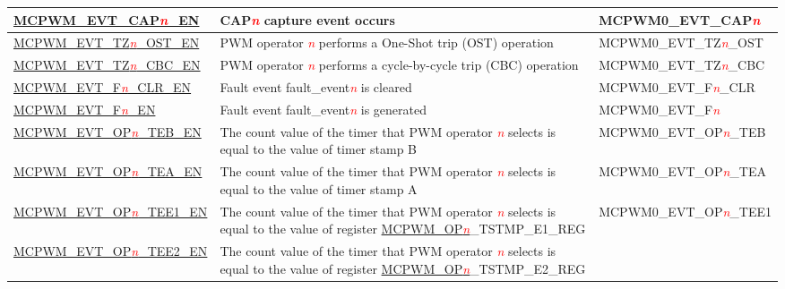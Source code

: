 \begin{ThreePartTable}
\begin{longtable}[c]{| l | L{7cm} | l |}
    \hyperref[fielddesc:MCPWMEVTCAP0EN]{MCPWM\_EVT\_CAP\textcolor{red}{\it{n}}\_EN}  
    &  CAP\textcolor{red}{\it{n}} capture event occurs
    &  MCPWM0\_EVT\_CAP\textcolor{red}{\it{n}}    \\\hline
    \hyperref[fielddesc:MCPWMEVTTZ0OSTEN]{MCPWM\_EVT\_TZ\textcolor{red}{\it{n}}\_OST\_EN}  
    &  PWM operator \textcolor{red}{\it{n}} performs a One-Shot trip (OST) operation
    &  MCPWM0\_EVT\_TZ\textcolor{red}{\it{n}}\_OST    \\\hline
    \hyperref[fielddesc:MCPWMEVTTZ0CBCEN]{MCPWM\_EVT\_TZ\textcolor{red}{\it{n}}\_CBC\_EN}
    & PWM operator \textcolor{red}{\it{n}} performs a cycle-by-cycle trip (CBC) operation
    & MCPWM0\_EVT\_TZ\textcolor{red}{\it{n}}\_CBC    \\\hline
    \hyperref[fielddesc:MCPWMEVTF0CLREN]{MCPWM\_EVT\_F\textcolor{red}{\it{n}}\_CLR\_EN}
    & Fault event fault\_event\textcolor{red}{\it{n}} is cleared
    & MCPWM0\_EVT\_F\textcolor{red}{\it{n}}\_CLR    \\\hline
    \hyperref[fielddesc:MCPWMEVTF0EN]{MCPWM\_EVT\_F\textcolor{red}{\it{n}}\_EN}
    & Fault event fault\_event\textcolor{red}{\it{n}} is generated
    & MCPWM0\_EVT\_F\textcolor{red}{\it{n}}    \\\hline
    \hyperref[fielddesc:MCPWMEVTOP0TEBEN]{MCPWM\_EVT\_OP\textcolor{red}{\it{n}}\_TEB\_EN}
    & The count value of the timer that PWM operator \textcolor{red}{\it{n}} selects is equal to the value of timer stamp B
    & MCPWM0\_EVT\_OP\textcolor{red}{\it{n}}\_TEB    \\\hline
    \hyperref[fielddesc:MCPWMEVTOP0TEAEN]{MCPWM\_EVT\_OP\textcolor{red}{\it{n}}\_TEA\_EN}
    & The count value of the timer that PWM operator \textcolor{red}{\it{n}} selects is equal to the value of timer stamp A
    & MCPWM0\_EVT\_OP\textcolor{red}{\it{n}}\_TEA    \\\hline
    \hyperref[fielddesc:MCPWMEVTOPNTEE1EN]{MCPWM\_EVT\_OP\textcolor{red}{\it{n}}\_TEE1\_EN}
    & The count value of the timer that PWM operator \textcolor{red}{\it{n}} selects is equal to the value of register \hyperref[regdesc:MCPWMOPNTSTMPE1REG]{MCPWM\_OP\textcolor{red}{\it{n}}}\_TSTMP\_E1\_REG
    & MCPWM0\_EVT\_OP\textcolor{red}{\it{n}}\_TEE1    \\\hline
    \hyperref[fielddesc:MCPWMEVTOPNTEE2EN]{MCPWM\_EVT\_OP\textcolor{red}{\it{n}}\_TEE2\_EN}
    & The count value of the timer that PWM operator \textcolor{red}{\it{n}} selects is equal to the value of register \hyperref[regdesc:MCPWMOPNTSTMPE2REG]{MCPWM\_OP\textcolor{red}{\it{n}}}\_TSTMP\_E2\_REG

\end{longtable}
\end{ThreePartTable}
